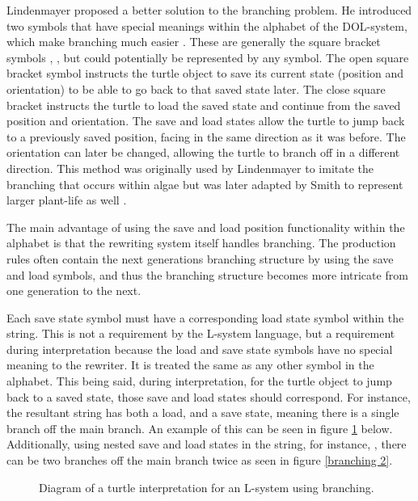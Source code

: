 Lindenmayer proposed a better solution to the branching problem. He introduced two symbols that have special meanings within the alphabet of the DOL-system, which make branching much easier \cite{lindenmayer1968mathematical}. These are generally the square bracket symbols \say{[}, \say{]}, but could potentially be represented by any symbol. The open square bracket \say{[} symbol instructs the turtle object to save its current state (position and orientation) to be able to go back to that saved state later. The close square bracket \say{]} instructs the turtle to load the saved state and continue from the saved position and orientation. The save and load states allow the turtle to jump back to a previously saved position, facing in the same direction as it was before. The orientation can later be changed, allowing the turtle to branch off in a different direction. This method was originally used by Lindenmayer to imitate the branching that occurs within algae but was later adapted by Smith to represent larger plant-life as well \cite{smith1984plants}.

\newpage
\noindent
The main advantage of using the save and load position functionality within the alphabet is that the rewriting system itself handles branching. The production rules often contain the next generations branching structure by using the save and load symbols, and thus the branching structure becomes more intricate from one generation to the next.

Each save state symbol must have a corresponding load state symbol within the string. This is not a requirement by the L-system language, but a requirement during interpretation because the load and save state symbols have no special meaning to the rewriter. It is treated the same as any other symbol in the alphabet. This being said, during interpretation, for the turtle object to jump back to a saved state, those save and load states should correspond. For instance, the resultant string  has both a load, and a save state, meaning there is a single branch off the main branch. An example of this can be seen in figure \ref{branching 1} below. Additionally, using nested save and load states in the string, for instance, , there can be two branches off the main branch twice as seen in figure \ref{branching 2}.

\begin{figure}[htbp]
	{\centering
		\setlength{\fboxrule}{1pt}
		\vspace{7px}
		\caption{Diagram of a turtle interpretation for an L-system using branching.} \label{branching 1}
	}
\end{figure}
\FloatBarrier

